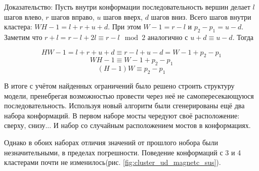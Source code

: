 \documentclass[14pt]{extarticle}
\begin{document}
Доказательство: 
Пусть внутри конформации последовательность вершин делает $l$ шагов влево, $r$ шагов вправо, $u$ шагов вверх, $d$ шагов вниз. Всего шагов внутри кластера: $ W H - 1 = l + r + u + d $. При этом $W - 1 = r - l$ и $p_2 - p_1 = u - d$. Заметим что $ r + l = r - l + 2l \equiv r - l \mod 2$ аналогично с $u+d \equiv u-d$. Тогда

\[
    H W - 1 = l + r + u + d \equiv r - l + u - d = W - 1 + p_2 - p_1 
\]
\[
    W H - 1 \equiv W - 1 + p_2 - p_1
\]
\[    
    (H - 1)W \equiv p_2 - p_1
\]

В итоге с учётом найденных ограничений было решено строить структуру модели, пренебрегая возможностью провести через неё не самопересекающуюся последовательность. 
Используя новый алгоритм были сгенерированы ещё два набора конформаций. В первом наборе мосты чередуют своё расположение: сверху, снизу... И набор со случайным расположением мостов в конформациях.

Однако в обоих наборах отличия значений от прошлого нобора были незначительными, в пределах погрешности. Поведение конформаций с 3 и 4 кластерами почти не изменилось(рис. \ref*{fig:cluster_ud_magnetc_sus}). 
\end{document}
